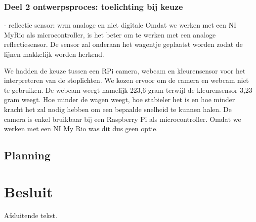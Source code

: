 \documentclass[a4paper,twoside,kulak]{kulakreport} %
\begin{document}
\subsection{Deel 2 ontwerpsproces: toelichting bij keuze}

- reflectie sensor: wrm analoge en niet digitale
Omdat we werken met een NI MyRio als microcontroller, is het beter om te werken met een analoge reflectiesensor.
De sensor zal onderaan het wagentje geplaatst worden zodat de lijnen makkelijk worden herkend.


We hadden de keuze tussen een RPi camera, webcam en kleurensensor voor het interpreteren van de stoplichten. We kozen ervoor om de camera en webcam niet te gebruiken. De webcam weegt namelijk 223,6 gram terwijl de kleurensensor 3,23 gram weegt. Hoe minder de wagen weegt, hoe stabieler het is en hoe minder kracht het zal nodig hebben om een bepaalde snelheid te kunnen halen. De camera is enkel bruikbaar bij een Raspberry Pi als microcontroller. Omdat we werken met een NI My Rio was dit dus geen optie.


\section{Planning}

\chapter*{Besluit}
Afsluitende tekst.
\end{document}
